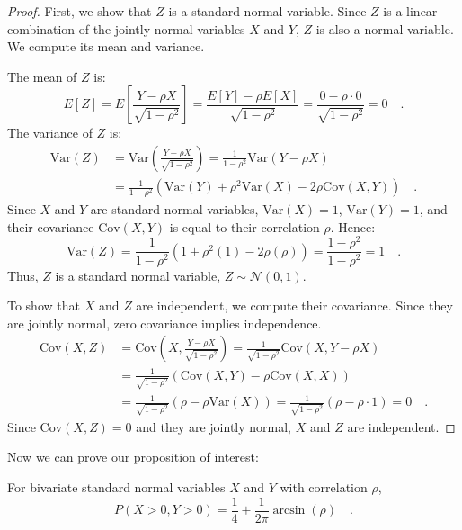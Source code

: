 \documentclass[../../main.tex]{subfiles}
\begin{document}
\begin{proof}
First, we show that $Z$ is a standard normal variable. Since $Z$ is a linear combination of the jointly normal variables $X$ and $Y$, $Z$ is also a normal variable. We compute its mean and variance.

The mean of $Z$ is:
$$ E[Z] = E\left[\frac{Y-\rho X}{\sqrt{1-\rho^2}}\right] = \frac{E[Y]-\rho E[X]}{\sqrt{1-\rho^2}} = \frac{0 - \rho \cdot 0}{\sqrt{1-\rho^2}} = 0 \quad .$$
The variance of $Z$ is:
\begin{align*}
    \text{Var}(Z) &= \text{Var}\left(\frac{Y-\rho X}{\sqrt{1-\rho^2}}\right) = \frac{1}{1-\rho^2}\text{Var}(Y-\rho X) \\
    &= \frac{1}{1-\rho^2}\left(\text{Var}(Y) + \rho^2\text{Var}(X) - 2\rho\text{Cov}(X,Y)\right) \quad .
\end{align*}
Since $X$ and $Y$ are standard normal variables, $\text{Var}(X) = 1$, $\text{Var}(Y) = 1$, and their covariance $\text{Cov}(X,Y)$ is equal to their correlation $\rho$. Hence:
$$ \text{Var}(Z) = \frac{1}{1-\rho^2}(1 + \rho^2(1) - 2\rho(\rho)) = \frac{1-\rho^2}{1-\rho^2} = 1 \quad . $$
Thus, $Z$ is a standard normal variable, $Z \sim \mathcal{N}(0,1)$.

To show that $X$ and $Z$ are independent, we compute their covariance. Since they are jointly normal, zero covariance implies independence.
\begin{align*}
    \text{Cov}(X,Z) &= \text{Cov}\left(X, \frac{Y-\rho X}{\sqrt{1-\rho^2}}\right) = \frac{1}{\sqrt{1-\rho^2}}\text{Cov}(X, Y-\rho X) \\
    &= \frac{1}{\sqrt{1-\rho^2}}\left(\text{Cov}(X,Y) - \rho\text{Cov}(X,X)\right) \\
    &= \frac{1}{\sqrt{1-\rho^2}}\left(\rho - \rho\text{Var}(X)\right) = \frac{1}{\sqrt{1-\rho^2}}(\rho - \rho \cdot 1) = 0 \quad .
\end{align*}
Since $\text{Cov}(X,Z)=0$ and they are jointly normal, $X$ and $Z$ are independent.
\end{proof}

Now we can prove our proposition of interest:

\begin{proposition}
For bivariate standard normal variables $X$ and $Y$ with correlation $\rho$,
$$ P(X>0, Y>0) = \frac{1}{4} + \frac{1}{2\pi}\arcsin(\rho) \quad . $$
\end{proposition}
\end{document}
